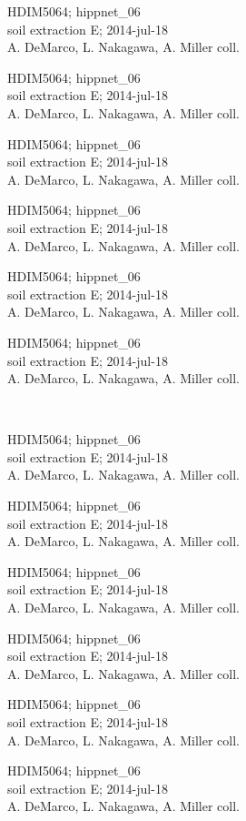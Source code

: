 \documentclass[2pt]{extarticle}
\begin{document}
\noindent
\parbox{0.16\textwidth}{\tiny \raggedright \rule[-0.3\baselineskip]{0pt}{10pt}HDIM5064; hippnet\_06\\ soil extraction E; 2014-jul-18\\ A. DeMarco, L. Nakagawa, A. Miller coll.}
\parbox{0.16\textwidth}{\tiny \raggedright \rule[-0.3\baselineskip]{0pt}{10pt}HDIM5064; hippnet\_06\\ soil extraction E; 2014-jul-18\\ A. DeMarco, L. Nakagawa, A. Miller coll.}
\parbox{0.16\textwidth}{\tiny \raggedright \rule[-0.3\baselineskip]{0pt}{10pt}HDIM5064; hippnet\_06\\ soil extraction E; 2014-jul-18\\ A. DeMarco, L. Nakagawa, A. Miller coll.}
\parbox{0.16\textwidth}{\tiny \raggedright \rule[-0.3\baselineskip]{0pt}{10pt}HDIM5064; hippnet\_06\\ soil extraction E; 2014-jul-18\\ A. DeMarco, L. Nakagawa, A. Miller coll.}
\parbox{0.16\textwidth}{\tiny \raggedright \rule[-0.3\baselineskip]{0pt}{10pt}HDIM5064; hippnet\_06\\ soil extraction E; 2014-jul-18\\ A. DeMarco, L. Nakagawa, A. Miller coll.}
\parbox{0.16\textwidth}{\tiny \raggedright \rule[-0.3\baselineskip]{0pt}{10pt}HDIM5064; hippnet\_06\\ soil extraction E; 2014-jul-18\\ A. DeMarco, L. Nakagawa, A. Miller coll.} \\ 
\vspace{0.001in} 

\noindent
\parbox{0.16\textwidth}{\tiny \raggedright \rule[-0.3\baselineskip]{0pt}{10pt}HDIM5064; hippnet\_06\\ soil extraction E; 2014-jul-18\\ A. DeMarco, L. Nakagawa, A. Miller coll.}
\parbox{0.16\textwidth}{\tiny \raggedright \rule[-0.3\baselineskip]{0pt}{10pt}HDIM5064; hippnet\_06\\ soil extraction E; 2014-jul-18\\ A. DeMarco, L. Nakagawa, A. Miller coll.}
\parbox{0.16\textwidth}{\tiny \raggedright \rule[-0.3\baselineskip]{0pt}{10pt}HDIM5064; hippnet\_06\\ soil extraction E; 2014-jul-18\\ A. DeMarco, L. Nakagawa, A. Miller coll.}
\parbox{0.16\textwidth}{\tiny \raggedright \rule[-0.3\baselineskip]{0pt}{10pt}HDIM5064; hippnet\_06\\ soil extraction E; 2014-jul-18\\ A. DeMarco, L. Nakagawa, A. Miller coll.}
\parbox{0.16\textwidth}{\tiny \raggedright \rule[-0.3\baselineskip]{0pt}{10pt}HDIM5064; hippnet\_06\\ soil extraction E; 2014-jul-18\\ A. DeMarco, L. Nakagawa, A. Miller coll.}
\parbox{0.16\textwidth}{\tiny \raggedright \rule[-0.3\baselineskip]{0pt}{10pt}HDIM5064; hippnet\_06\\ soil extraction E; 2014-jul-18\\ A. DeMarco, L. Nakagawa, A. Miller coll.} \\ 
\vspace{0.001in} 
\end{document}
